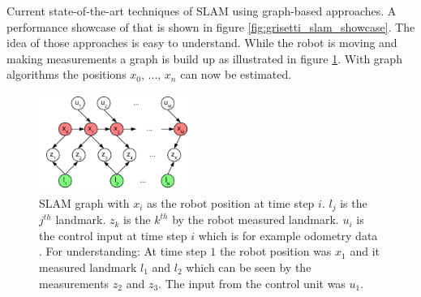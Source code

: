 Current state-of-the-art techniques of SLAM using graph-based approaches. A performance showcase of 
that is shown in figure \ref{fig:grisetti_slam_showcase}. The idea of those approaches is easy to 
understand. While the robot is moving and making measurements a graph is build up as illustrated in 
figure \ref{fig:kaess_slam_graph}. With graph algorithms the positions $x_0$, ..., $x_n$ can now be
estimated.

\begin{figure}[h!]
	\centering
	\includegraphics[width=0.45\textwidth]{images/kaess_slam_graph.png}
	\caption{
        SLAM graph with $x_i$ as the robot position at time step $i$. $l_j$ is the $j^{th}$ landmark. 
        $z_k$ is the $k^{th}$ by the robot measured landmark. $u_i$ is the control input at time step 
        $i$ which is for example odometry data \cite{kaess_isam:_2008}. For understanding: 
        At time step $1$ the robot position was $x_1$ and it measured landmark $l_1$ and $l_2$ 
        which can be seen by the measurements $z_2$ and $z_3$. The input from the control unit was $u_1$.
        }
	\label{fig:kaess_slam_graph}
\end{figure}